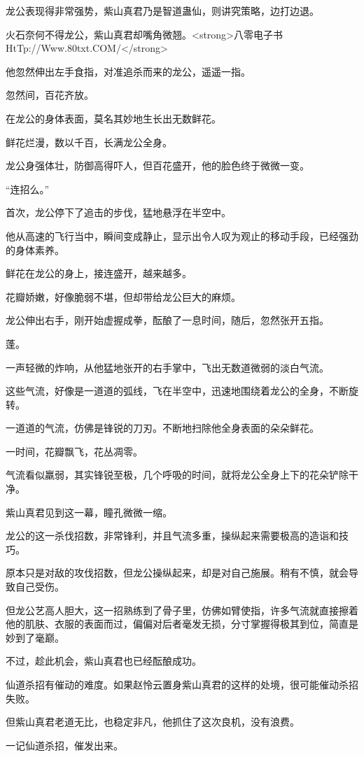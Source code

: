\begin{this_body}
龙公表现得非常强势，紫山真君乃是智道蛊仙，则讲究策略，边打边退。

火石奈何不得龙公，紫山真君却嘴角微翘。<strong>八零电子书HtTp://Www.80txt.COM/</strong>

他忽然伸出左手食指，对准追杀而来的龙公，遥遥一指。

忽然间，百花齐放。

在龙公的身体表面，莫名其妙地生长出无数鲜花。

鲜花烂漫，数以千百，长满龙公全身。

龙公身强体壮，防御高得吓人，但百花盛开，他的脸色终于微微一变。

“连招么。”

首次，龙公停下了追击的步伐，猛地悬浮在半空中。

他从高速的飞行当中，瞬间变成静止，显示出令人叹为观止的移动手段，已经强劲的身体素养。

鲜花在龙公的身上，接连盛开，越来越多。

花瓣娇嫩，好像脆弱不堪，但却带给龙公巨大的麻烦。

龙公伸出右手，刚开始虚握成拳，酝酿了一息时间，随后，忽然张开五指。

蓬。

一声轻微的炸响，从他猛地张开的右手掌中，飞出无数道微弱的淡白气流。

这些气流，好像是一道道的弧线，飞在半空中，迅速地围绕着龙公的全身，不断旋转。

一道道的气流，仿佛是锋锐的刀刃。不断地扫除他全身表面的朵朵鲜花。

一时间，花瓣飘飞，花丛凋零。

气流看似羸弱，其实锋锐至极，几个呼吸的时间，就将龙公全身上下的花朵铲除干净。

紫山真君见到这一幕，瞳孔微微一缩。

龙公的这一杀伐招数，非常锋利，并且气流多重，操纵起来需要极高的造诣和技巧。

原本只是对敌的攻伐招数，但龙公操纵起来，却是对自己施展。稍有不慎，就会导致自己受伤。

但龙公艺高人胆大，这一招熟练到了骨子里，仿佛如臂使指，许多气流就直接擦着他的肌肤、衣服的表面而过，偏偏对后者毫发无损，分寸掌握得极其到位，简直是妙到了毫巅。

不过，趁此机会，紫山真君也已经酝酿成功。

仙道杀招有催动的难度。如果赵怜云置身紫山真君的这样的处境，很可能催动杀招失败。

但紫山真君老道无比，也稳定非凡，他抓住了这次良机，没有浪费。

一记仙道杀招，催发出来。


\end{this_body}
